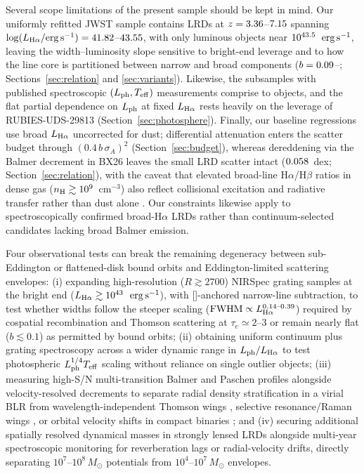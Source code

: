 \documentclass[twocolumn,linenumbers]{aastex701}
\newcommand{\Ha}{H$\alpha$}
\newcommand{\Hb}{H$\beta$}
\newcommand{\ergs}{\ensuremath{{\rm erg\,s^{-1}}}}
\newcommand{\LHa}{L_{\rm H\alpha}}
\newcommand{\Lph}{L_{\rm ph}}
\newcommand{\Teff}{T_{\rm eff}}
\providecommand{\Msun}{M_\odot}
\newcommand{\BX}{BX26}
\begin{document}
Several scope limitations of the present sample should be kept in mind.
Our uniformly refitted JWST sample contains \NLRD{} LRDs at $z=3.36{}$--$7.15{}$ spanning $\log(\LHa/\ergs)=\LLRDmin{}$--$43.55{}$, with only \NBright{} luminous objects near $10^{43.5{}}$~\ergs{}, leaving the width--luminosity slope sensitive to bright-end leverage and to how the line core is partitioned between narrow and broad components ($b=0.09{}$--\Fb{}; Sections~\ref{sec:relation} and \ref{sec:variants}).
Likewise, the subsamples with published spectroscopic $(\Lph,\Teff)$ measurements comprise \NPE{} to \NPA{} objects, and the flat partial dependence on $\Lph$ at fixed $\LHa$ rests heavily on the leverage of RUBIES-UDS-29813 (Section~\ref{sec:photosphere}).
Finally, our baseline regressions use broad $\LHa$ uncorrected for dust; differential attenuation enters the scatter budget through $(0.4\,b\,\sigma_A)^2$ (Section~\ref{sec:budget}), whereas dereddening via the Balmer decrement in \BX{} leaves the small LRD scatter intact ($0.058{}$~dex; Section~\ref{sec:relation}), with the caveat that elevated broad-line \Ha/\Hb{} ratios in dense gas ($n_{\rm H}\gtrsim10^{9}$~cm$^{-3}$) also reflect collisional excitation and radiative transfer rather than dust alone \citep{Chang2025,ChenCH2026}.
Our constraints likewise apply to spectroscopically confirmed broad-\Ha{} LRDs rather than continuum-selected candidates lacking broad Balmer emission.

Four observational tests can break the remaining degeneracy between sub-Eddington or flattened-disk bound orbits and Eddington-limited scattering envelopes:
(i) expanding high-resolution ($R\gtrsim2700$) NIRSpec grating samples at the bright end ($\LHa\gtrsim10^{43}$~\ergs{}), with []-anchored narrow-line subtraction, to test whether widths follow the steeper scaling (${\rm FWHM}\propto\LHa^{\shellSlopeLo{}\text{--}\shellSlopeHi{}}$) required by cospatial recombination and Thomson scattering at $\tau_e\simeq2$--3 or remain nearly flat ($b\lesssim0.1$) as permitted by bound orbits;
(ii) obtaining uniform continuum plus grating spectroscopy across a wider dynamic range in $\Lph/\LHa$ to test photospheric $\Lph^{1/4}\Teff$ scaling without reliance on single outlier objects;
(iii) measuring high-S/N multi-transition Balmer and Paschen profiles \citep{Brazzini2025} alongside velocity-resolved decrements \citep{ChenCH2026} to separate radial density stratification in a virial BLR \citep{Madau2026b,Scholtz2026} from wavelength-independent Thomson wings \citep{Rusakov2026}, selective resonance/Raman wings \citep{Chang2025}, or orbital velocity shifts in compact binaries \citep{InayoshiChen2026}; and
(iv) securing additional spatially resolved dynamical masses in strongly lensed LRDs \citep{Juodzbalis2026} alongside multi-year spectroscopic monitoring for reverberation lags or radial-velocity drifts, directly separating $10^{7}$--$10^{8}\,\Msun$ potentials from $10^{4}$--$10^{7}\,\Msun$ envelopes.
\end{document}
